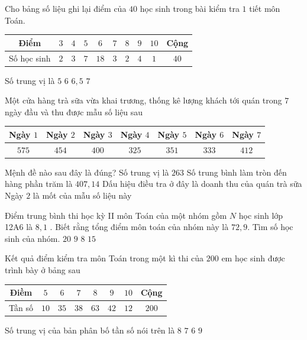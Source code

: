 \begin{ex}%
	Cho bảng số liệu ghi lại điểm của $ 40$ học sinh trong bài kiểm tra $ 1$ tiết môn Toán.
	\begin{center}
		\begin{tabular}{|c|c|c|c|c|c|c|c|c|c|}
			\hline
			Điểm & $ 3$ & $ 4$ & $ 5$ & $ 6$ & $ 7$ & $ 8$ & $ 9$ & $ 10$ & Cộng\\
			\hline
			Số học sinh & $ 2$ & $ 3$ & $ 7$ & $18$ & $ 3$ & $ 2$ & $ 4$ & $ 1$ & $ 40$\\
			\hline
		\end{tabular}
	\end{center}
	Số trung vị là
	\choice
	{$5$}
	{\True $6$}
	{$6{,}5$}
	{$7$}
\end{ex}

\begin{ex}%
	Một cửa hàng trà sữa vừa khai trương, thống kê lượng khách tới quán trong $7$ ngày đầu và thu được mẫu số liệu sau
	\begin{center}
		\begin{tabular}{|c|c|c|c|c|c|c|}
			\hline
			Ngày $1$ & Ngày $2$ & Ngày $3$ & Ngày $4$ & Ngày $5$ & Ngày $6$ & Ngày $7$\\
			\hline
			$575$ & $454$ & $400$ & $325$ & $351$ & $333$ & $412$\\
			\hline
		\end{tabular}
	\end{center}
	Mệnh đề nào sau đây là đúng?
	\choice
	{Số trung vị là $263$}
	{\True Số trung bình làm tròn đến hàng phần trăm là $407{,}14$}
	{Dấu hiệu điều tra ở đây là doanh thu của quán trà sữa}
	{Ngày $2$ là mốt của mẫu số liệu này}
\end{ex}

\begin{ex}%
	Điểm trung bình thi học kỳ II môn Toán của một nhóm gồm $N$ học sinh lớp 12A6 là $8{,}1$ . Biết rằng tổng điểm môn toán của nhóm này là $72{,}9$. Tìm số học sinh của nhóm.
	\choice
	{$20$}
	{\True $9$}
	{$8$}
	{$15$}
\end{ex}

\begin{ex}%
	Kết quả điểm kiểm tra môn Toán trong một kì thi của $ 200$ em học sinh được trình bày ở bảng sau
	\begin{center}
		\begin{tabular}{|c|c|c|c|c|c|c|c|}
			\hline Điềm & $5$ & $6$ & $7$ & $8$ & $9$ & $10$ & Cộng \\
			\hline Tần số & $10$ & $35$ & $38$ & $63$ & $42$ & $12$ & $200$ \\
			\hline
		\end{tabular}
	\end{center}
	Số trung vị của bản phân bố tần số nói trên là
	\choice
	{\True $8$}
	{$7$}
	{$6$}
	{$9$}
\end{ex}



